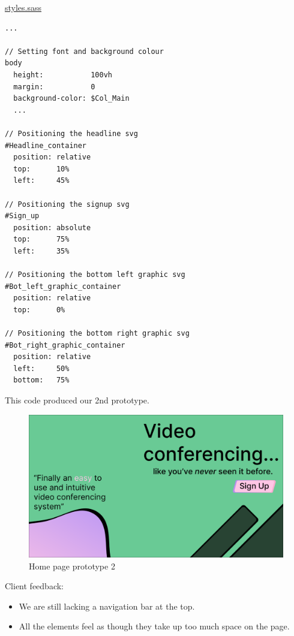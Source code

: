 \underline{styles.sass}
\begin{verbatim}
... 

// Setting font and background colour
body
  height:           100vh
  margin:           0
  background-color: $Col_Main
  ...

// Positioning the headline svg
#Headline_container
  position: relative
  top:      10%
  left:     45%

// Positioning the signup svg
#Sign_up
  position: absolute
  top:      75%
  left:     35%

// Positioning the bottom left graphic svg
#Bot_left_graphic_container
  position: relative
  top:      0%

// Positioning the bottom right graphic svg
#Bot_right_graphic_container
  position: relative
  left:     50%
  bottom:   75%
\end{verbatim}

This code produced our 2nd prototype.

\begin{figure}[H]
\centering

\includegraphics[scale=0.2]{Images/Proto_home2.png}

\caption{Home page prototype 2}
\end{figure}

{\color{gray} \hrulefill} \vspace{0.2cm}

{\sffamily Client feedback:}

\begin{itemize}
  \item We are still lacking a navigation bar at the top.
  \item All the elements feel as though they take up too much space on the page.
\end{itemize}

